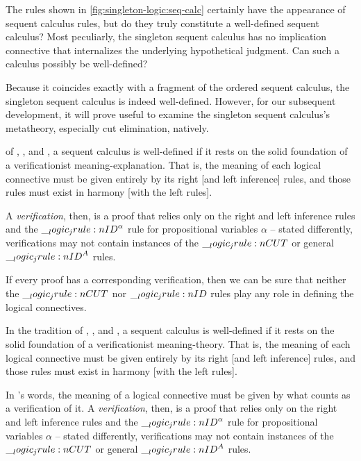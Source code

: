 The rules shown in \cref{fig:singleton-logic:seq-calc} certainly have the appearance of sequent calculus rules, but do they truly constitute a well-defined sequent calculus?
Most peculiarly, the singleton sequent calculus has no implication connective that internalizes the underlying hypothetical judgment.
Can such a calculus possibly be well-defined?

Because it coincides exactly with a fragment of the ordered sequent calculus, the singleton sequent calculus is indeed well-defined.
However, for our subsequent development, it will prove useful to examine the singleton sequent calculus's metatheory, especially cut elimination, natively.

 of \citeauthor{Gentzen:MZ35}, \citeauthor{Dummett:HUP91}, and \citeauthor{Martin-Lof:NJPL96}\autocites{Gentzen:MZ35}{Dummett:HUP91}{Martin-Lof:NJPL96}, a sequent calculus is well-defined if it rests on the solid foundation of a verificationist meaning-explanation.
That is, the meaning of each logical connective must be given entirely by its right [and left inference] rules, and those rules must exist in harmony [with the left rules].%

A \emph{verification}, then, is a proof that relies only on the right and left inference rules and the $\__logic_jrule:n {ID}^{\alpha}$ rule for propositional variables $\alpha$ -- stated differently, verifications may not contain instances of the $\__logic_jrule:n {CUT}$ or general $\__logic_jrule:n {ID}^A$ rules.

If every proof has a corresponding verification, then we can be sure that neither the $\__logic_jrule:n {CUT}$ nor $\__logic_jrule:n {ID}$ rules play any role in defining the logical connectives.


In the tradition of \citeauthor{Gentzen:??}, \citeauthor{Dummett:??}, and \citeauthor{Martin-Lof:??}\autocites{Gentzen:??}{Dummett:??}{Martin-Lof:??}, a sequent calculus is well-defined if it rests on the solid foundation of a verificationist meaning-theory.
That is, the meaning of each logical connective must be given entirely by its right [and left inference] rules, and those rules must exist in harmony [with the left rules].%

In \citeauthor{Martin-Lof:??}'s words, the meaning of a logical connective must be given by what counts as a verification of it.
A \emph{verification}, then, is a proof that relies only on the right and left inference rules and the $\__logic_jrule:n {ID}^{\alpha}$ rule for propositional variables $\alpha$ -- stated differently, verifications may not contain instances of the $\__logic_jrule:n {CUT}$ or general $\__logic_jrule:n {ID}^A$ rules.


